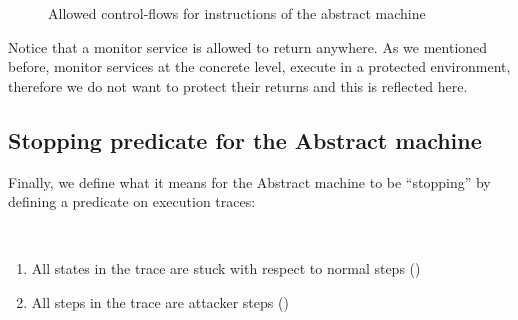 \begin{figure}[ht]
\bigskip

\bigskip

\bigskip

\caption{Allowed control-flows for instructions of the abstract machine}
\end{figure}

Notice that a monitor service is allowed to return anywhere. As we
mentioned before, monitor services at the concrete level, execute in a
protected environment, therefore we do not want to protect their
returns and this is reflected here.

\subsection{Stopping predicate for the Abstract machine}
\label{sec:abstract_stopping}

Finally, we define what it means for the Abstract machine to be ``stopping'' by
defining a predicate on execution traces:

\begin{definition}
\label{abstract_stopping}
~
\begin{enumerate}
\item All states in the trace are stuck with respect to normal steps
  (\stepn{}{})
\item All steps in the trace are attacker steps (\stepa{}{}{})
\end{enumerate}
\end{definition}

